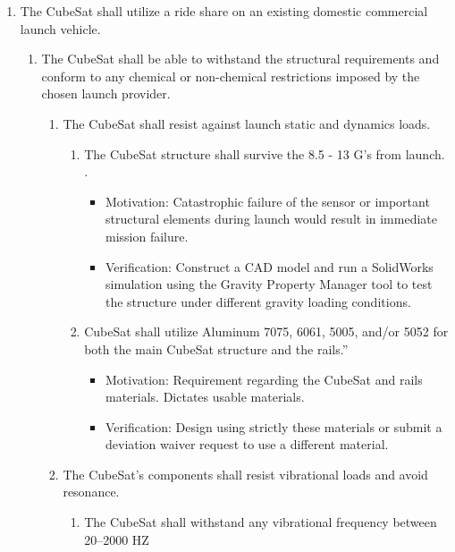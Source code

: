 \begin{enumerate}
\begin{enumerate}
    \end{enumerate} %
    \item The CubeSat shall utilize a ride share on an existing domestic commercial launch vehicle.
    \begin{enumerate}
        \item The CubeSat shall be able to withstand the structural requirements and conform to any chemical or non-chemical restrictions imposed by the chosen launch provider.  
        \begin{enumerate}
            \item The CubeSat shall resist against launch static and dynamics loads. 
            \begin{enumerate}
                \item The CubeSat structure shall survive the 8.5 - 13 G’s from launch. \cite{Falcon9}. 
                    \begin{itemize}
                        \item Motivation: Catastrophic failure of the sensor or important structural elements during launch would result in immediate mission failure.  
                        \item Verification: Construct a CAD model and run a SolidWorks simulation using the Gravity Property Manager tool to test the structure under different gravity loading conditions.
                    \end{itemize}
                \item CubeSat shall utilize Aluminum 7075, 6061, 5005, and/or 5052 for both the main CubeSat structure and the rails.” \cite{CSS}
                    \begin{itemize}
                        \item Motivation: Requirement regarding the CubeSat and rails materials. Dictates usable materials.   
                        \item Verification: Design using strictly these materials or submit a deviation waiver request to use a different material. 
                    \end{itemize}
            \end{enumerate}
        \item The CubeSat’s components shall resist vibrational loads and avoid resonance. 
        \begin{enumerate}
            \item The CubeSat shall withstand any vibrational frequency between 20–2000 HZ 
                \begin{itemize}

\end{itemize}
\end{enumerate}
\end{enumerate}
\end{enumerate}
\end{enumerate}
